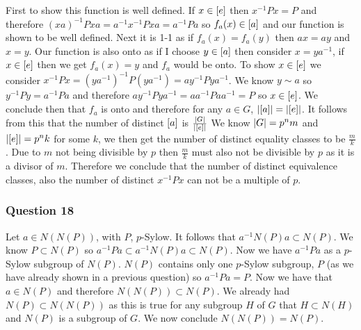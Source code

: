 \documentclass{article}
\begin{document}
First to show this function is well defined. If $x\in \left[{e}\right]$ then $x^{-1}Px = P$ and therefore $(xa)^{-1}Pxa = a^{-1}x^{-1}Pxa = a^{-1}Pa$ so $f_a(x)\in\left[{a}\right]$ and our function is shown to be well defined. Next it is 1-1 as if $f_a(x) = f_a(y)$ then $ax = ay$ and $x=y$. Our function is also onto as if I choose $y\in \left[{a}\right]$ then consider $x=ya^{-1}$, if $x\in \left[{e}\right]$ then we get $f_a(x) = y$ and $f_a$ would be onto. To show $x\in\left[{e}\right]$ we consider $x^{-1}Px=\left(ya^{-1}\right)^{-1}P\left(ya^{-1}\right) = ay^{-1}Pya^{-1}$. We know $y\sim a$ so $y^{-1}Py=a^{-1}Pa$ and therefore $ay^{-1}Pya^{-1} =aa^{-1}Paa^{-1} = P$ so $x \in \left[{e}\right]$. We conclude then that $f_a$ is onto and therefore for any $a\in G$, $\left| {\left[{a}\right]} \right| = \left| {\left[{e}\right]} \right|$. It follows from this that the number of distinct $\left[{a}\right]$ is $\frac{\left| {G} \right|}{\left| {\left[{e}\right]} \right|}$ We know $\left| {G} \right| = p^nm$ and $\left| {\left[{e}\right]} \right| =p^nk$ for some $k$, we then get the number of distinct equality classes to be $\frac mk$. Due to $m$ not being divisible by $p$ then $\frac mk$ must also not be divisible by $p$ as it is a divisor of $m$. Therefore we conclude that the number of distinct equivalence classes, also the number of distinct $x^{-1}Px$ can not be a multiple of $p$.

\subsubsection{Question 18}
Let $a \in N(N(P))$, with $P$, $p$-Sylow. It follows that $a^{-1}N(P)a\subset N(P)$. We know $P \subset N(P)$ so $a^{-1}Pa\subset a^{-1}N(P)a\subset N(P)$. Now we have $a^{-1}Pa$ as a $p$-Sylow subgroup of $N(P)$. $N(P)$ contains only one $p$-Sylow subgroup, $P$ (as we have already shown in a previous question) so $a^{-1}Pa = P$. Now we have that $a\in N(P)$ and therefore $N(N(P)) \subset N(P)$. We already had $N(P)\subset N(N(P))$ as this is true for any subgroup $H$ of $G$ that $H\subset N(H)$ and $N(P)$ is a subgroup of $G$. We now conclude $N(N(P)) = N(P)$.

\end{document}
